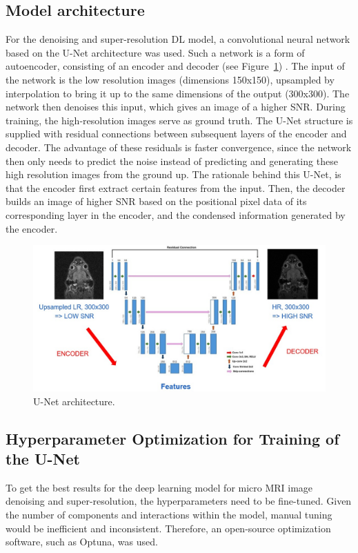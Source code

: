 \documentclass[twocolumn]{article}
\begin{document}
\subsection{Model architecture}
For the denoising and super-resolution DL model, a convolutional neural network based on the U-Net architecture was used. 
Such a network is a form of autoencoder, consisting of an encoder and decoder (see Figure~\ref{fig:U-Net}) \cite{ronneberger2015unet}.
The input of the network is the low resolution images (dimensions 150x150), upsampled by interpolation to bring it up to the same dimensions of the output (300x300). 
The network then denoises this input, which gives an image of a higher SNR. During training, the high-resolution images serve as ground truth.
The U-Net structure is supplied with residual connections between subsequent layers of the encoder and decoder. 
The advantage of these residuals is faster convergence, since the network then only needs to predict the noise instead of predicting and generating these high resolution images from the ground up.
The rationale behind this U-Net, is that the encoder first extract certain features from the input. 
Then, the decoder builds an image of higher SNR based on the positional pixel data of its corresponding layer in the encoder, and the condensed information generated by the encoder. 

\begin{figure}
    \centering
    \includegraphics[width=0.8\linewidth]{U-Net.jpg}
    \caption{U-Net architecture.}
    \label{fig:U-Net}
\end{figure}


\subsection{Hyperparameter Optimization for Training of the U-Net}
To get the best results for the deep learning model for micro MRI image denoising and super-resolution, the hyperparameters need to be fine-tuned. 
Given the number of components and interactions within the model, manual tuning would be inefficient and inconsistent. 
Therefore, an open-source optimization software, such as Optuna, was used. 
\end{document}
